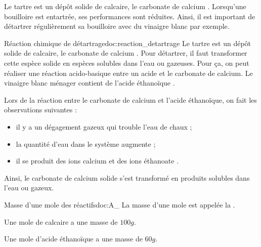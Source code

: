\teteSndChim
\vspace*{-6pt}
\nomPrenomClasse



\begin{contexte}
  Le tartre est un dépôt solide de calcaire, le carbonate de calcium .
  Lorsqu'une bouilloire est entartrée, ses performances sont réduites.
  Ainsi, il est important de détartrer régulièrement sa bouilloire avec du vinaigre blanc par exemple.
  
\end{contexte}


\begin{doc}{Réaction chimique de détartrage}{doc:reaction_detartrage}
  Le tartre est un dépôt solide de calcaire, le carbonate de calcium .
  Pour détartrer, il faut transformer cette espèce solide en espèces solubles dans l'eau ou gazeuses.
  Pour ça, on peut réaliser une réaction acido-basique entre un acide et le carbonate de calcium.
  Le vinaigre blanc ménager contient de l'acide éthanoïque .

  Lors de la réaction entre le carbonate de calcium et l'acide éthanoïque, on fait les observations suivantes :
  \begin{itemize}
    \item il y a un dégagement gazeux qui trouble l'eau de chaux ;
    \item la quantité d'eau dans le système augmente ;
    \item il se produit des ions calcium \ionCalcium et des ions éthanoate .
  \end{itemize}
    
  Ainsi, le carbonate de calcium solide s'est transformé en produits solubles dans l'eau ou gazeux.
\end{doc}

\begin{doc}{Masse d'une mole des réactifs}{doc:A_}
  La masse d'une mole est appelée la .

  \begin{donnees}
    \item Une mole de calcaire  a une masse de $100 \unit{g}$.
    \item Une mole d'acide éthanoïque  a une masse de $60 \unit{g}$.
  \end{donnees}
\end{doc}

